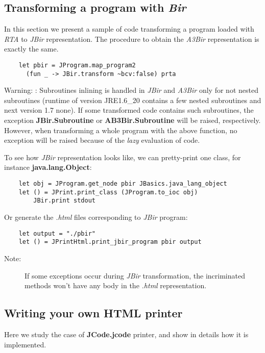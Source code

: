 \documentclass{article}
\begin{document}
\subsection{Transforming a program with \emph{Bir}}

In this section we present a sample of code transforming a program
loaded with \emph{RTA} to \emph{JBir} representation. The procedure
to obtain the \emph{A3Bir} representation is exactly the same.

\begin{verbatim}
    let pbir = JProgram.map_program2
      (fun _ -> JBir.transform ~bcv:false) prta
\end{verbatim}
Warning: : Subroutines inlining is handled in \emph{JBir} and
\emph{A3Bir} only for not nested subroutines (runtime of version
JRE1.6\_20 contains a few nested subroutines and next version 1.7
none). If some transformed code contains such subroutines, the
exception \textbf{JBir.Subroutine} or \textbf{AB3Bir.Subroutine}
will be raised, respectively. However, when transforming a whole
program with the above function, no exception will be raised
because of the \emph{lazy} evaluation of code.

To see how \emph{JBir} representation looks like, we can
pretty-print one class, for instance \textbf{java.lang.Object}:

\begin{verbatim}
    let obj = JProgram.get_node pbir JBasics.java_lang_object
    let () = JPrint.print_class (JProgram.to_ioc obj)
        JBir.print stdout
\end{verbatim}
Or generate the \emph{.html} files corresponding to \emph{JBir}
program:

\begin{verbatim}
    let output = "./pbir"
    let () = JPrintHtml.print_jbir_program pbir output
\end{verbatim}
\begin{description}
\item[Note:]
If some exceptions occur during \emph{JBir} transformation, the
incriminated methods won't have any body in the \emph{.html}
representation.
\end{description}
\subsection{Writing your own HTML printer}

Here we study the case of \textbf{JCode.jcode} printer, and show in
details how it is implemented.
\end{document}
